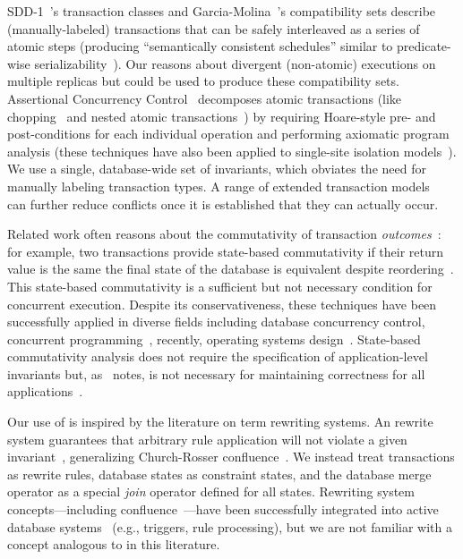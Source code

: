 SDD-1~\cite{sdd1}'s transaction classes and
Garcia-Molina~\cite{garciamolina-semantics}'s compatibility sets
describe (manually-labeled) transactions that can be safely
interleaved as a series of atomic steps (producing ``semantically
consistent schedules'' similar to predicate-wise
serializability~\cite{korth-serializability}). Our \iconfluence
reasons about divergent (non-atomic) executions on multiple replicas
but could be used to produce these compatibility sets. Assertional
Concurrency Control~\cite{decomp-semantics} decomposes atomic
transactions (like chopping~\cite{chopping} and nested atomic
transactions~\cite{atomictransactions}) by requiring Hoare-style pre-
and post-conditions for each individual operation and performing
axiomatic program analysis (these techniques have also been applied to
single-site isolation models~\cite{isolation-semantics}). We use a
single, database-wide set of invariants, which obviates the need for
manually labeling transaction types. A range of extended transaction
models~\cite{acta} can further reduce conflicts once it is established
that they can actually occur.

 Related work often reasons about
the commutativity of transaction \textit{outcomes}~\cite{boosting}:
for example, two transactions provide state-based commutativity if
their return value is the same the final state of the database is
equivalent despite reordering~\cite{weihl-thesis}. This state-based
commutativity is a sufficient but not necessary condition for
concurrent execution. Despite its conservativeness, these techniques
have been successfully applied in diverse fields including database
concurrency control, concurrent programming~\cite{boosting}, recently,
operating systems design~\cite{kohler-commutativity}. State-based
commutativity analysis does not require the specification of
application-level invariants but, as~\cite{kohler-commutativity}
notes, is not necessary for maintaining correctness for all
applications~\cite{lamport-audit}.

 Our use of \iconfluence is inspired by the
literature on term rewriting systems. An \iconfluent rewrite system
guarantees that arbitrary rule application will not violate a given
invariant~\cite{obs-confluence}, generalizing Church-Rosser
confluence~\cite{termrewriting}. We instead treat transactions as
rewrite rules, database states as constraint states, and the database
merge operator as a special \textit{join} operator defined for all
states.  Rewriting system concepts---including
confluence~\cite{aiken-confluence}---have been successfully integrated
into active database systems~\cite{activedb-book} (e.g., triggers,
rule processing), but we are not familiar with a concept analogous to
\iconfluence in this literature.

